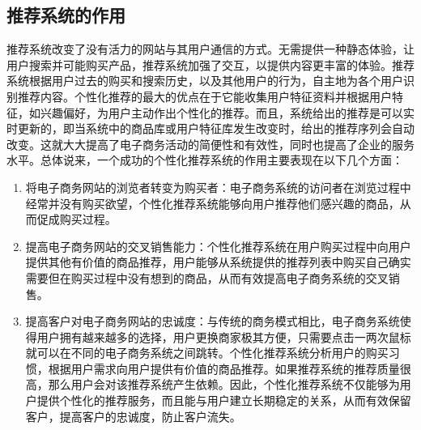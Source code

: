 	\subsection{推荐系统的作用}
	推荐系统改变了没有活力的网站与其用户通信的方式。无需提供一种静态体验，让用户搜索并可能购买产品，推荐系统加强了交互，以提供内容更丰富的体验。推荐系统根据用户过去的购买和搜索历史，以及其他用户的行为，自主地为各个用户识别推荐内容。个性化推荐的最大的优点在于它能收集用户特征资料并根据用户特征，如兴趣偏好，为用户主动作出个性化的推荐。而且，系统给出的推荐是可以实时更新的，即当系统中的商品库或用户特征库发生改变时，给出的推荐序列会自动改变。这就大大提高了电子商务活动的简便性和有效性，同时也提高了企业的服务水平。总体说来，一个成功的个性化推荐系统的作用主要表现在以下几个方面：
	\begin{enumerate}[(1)]
	\item 将电子商务网站的浏览者转变为购买者：电子商务系统的访问者在浏览过程中经常并没有购买欲望，个性化推荐系统能够向用户推荐他们感兴趣的商品，从而促成购买过程。
	\item 提高电子商务网站的交叉销售能力：个性化推荐系统在用户购买过程中向用户提供其他有价值的商品推荐，用户能够从系统提供的推荐列表中购买自己确实需要但在购买过程中没有想到的商品，从而有效提高电子商务系统的交叉销售。
	\item 提高客户对电子商务网站的忠诚度：与传统的商务模式相比，电子商务系统使得用户拥有越来越多的选择，用户更换商家极其方便，只需要点击一两次鼠标就可以在不同的电子商务系统之间跳转。个性化推荐系统分析用户的购买习惯，根据用户需求向用户提供有价值的商品推荐。如果推荐系统的推荐质量很高，那么用户会对该推荐系统产生依赖。因此，个性化推荐系统不仅能够为用户提供个性化的推荐服务，而且能与用户建立长期稳定的关系，从而有效保留客户，提高客户的忠诚度，防止客户流失。
	\end{enumerate}

